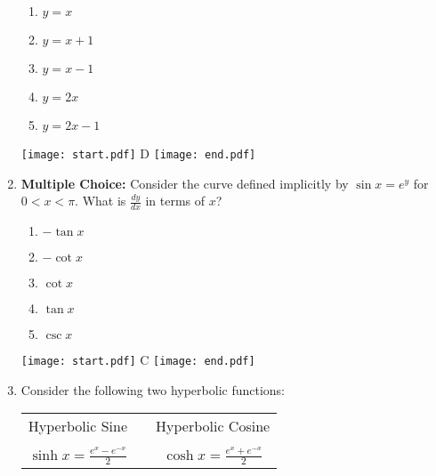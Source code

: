 \documentclass[12pt]{article}
\begin{document}
\begin{enumerate}
\begin{enumerate}
\item $y=x$\\

\item $y=x+1$\\

\item $y=x-1$\\

\item $y=2x$\\

\item $y=2x-1$\\

\end{enumerate}

\texttt{[image: start.pdf]}
{{D}}
\texttt{[image: end.pdf]}


\newpage

\item {\bf Multiple Choice:} Consider the curve defined implicitly by $\sin{x}=e^y$ for $0<x<\pi$. What is $\frac{dy}{dx}$ in terms of $x$?

\begin{enumerate}

\item $-\tan{x}$\\

\item $-\cot{x}$\\

\item $\cot{x}$\\

\item $\tan{x}$\\

\item $\csc{x}$

\end{enumerate}

\texttt{[image: start.pdf]}
{{C}}
\texttt{[image: end.pdf]}


\item Consider the following two hyperbolic functions:

\smallskip

\begin{center}
\begin{tabular}{ccc}
Hyperbolic Sine & & Hyperbolic Cosine\\
& & \\
$\sinh{x}=\frac{e^x-e^{-x}}{2}$ & \hspace{1 cm} & $\cosh{x}=\frac{e^x+e^{-x}}{2}$
\end{tabular}
\end{center}


\end{enumerate}
\end{document}
